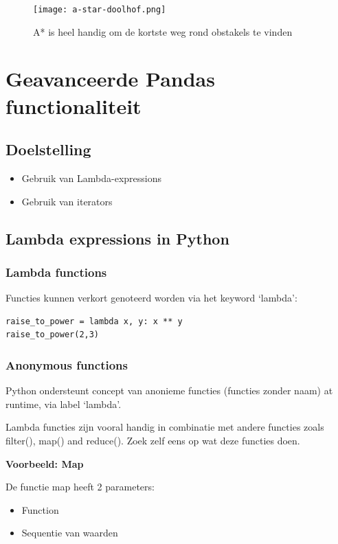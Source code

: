 \documentclass{article}
\begin{document}
\begin{figure}[H]
    \centering
    \texttt{[image: a-star-doolhof.png]}
    \caption{A* is heel handig om de kortste weg rond obstakels te vinden}
\end{figure}

\section{Geavanceerde Pandas functionaliteit}

\subsection{Doelstelling}

\begin{itemize}
    \item Gebruik van Lambda-expressions
    \item Gebruik van iterators
\end{itemize}

\subsection{Lambda expressions in Python}

\subsubsection{Lambda functions}

Functies kunnen verkort genoteerd worden via het keyword `lambda':

\begin{verbatim}
raise_to_power = lambda x, y: x ** y
raise_to_power(2,3)
\end{verbatim}

\subsubsection{Anonymous functions}

Python ondersteunt concept van anonieme functies (functies zonder
naam) at runtime, via label `lambda'.

Lambda functies zijn vooral handig in combinatie met andere functies
zoals filter(), map() and reduce(). Zoek zelf eens op wat deze functies doen.

\textbf{Voorbeeld: Map}

De functie map heeft 2 parameters:

\begin{itemize}
    \item Function
    \item Sequentie van waarden
\end{itemize}
\end{document}
